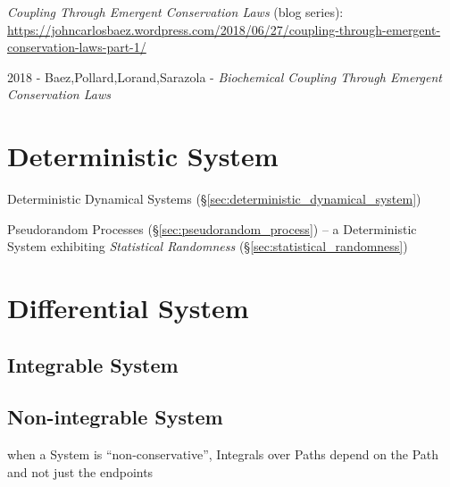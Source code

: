 \emph{Coupling Through Emergent Conservation Laws} (blog series):
\url{https://johncarlosbaez.wordpress.com/2018/06/27/coupling-through-emergent-conservation-laws-part-1/}

2018 - Baez,Pollard,Lorand,Sarazola -
\emph{Biochemical Coupling Through Emergent Conservation Laws}



\section{Deterministic System}\label{sec:deterministic_system}

\fist Deterministic Dynamical Systems
(\S\ref{sec:deterministic_dynamical_system})

\fist Pseudorandom Processes (\S\ref{sec:pseudorandom_process}) -- a
Deterministic System exhibiting \emph{Statistical Randomness}
(\S\ref{sec:statistical_randomness})



\section{Differential System}\label{sec:differential_system}




\subsection{Integrable System}\label{sec:integrable_system}

\subsection{Non-integrable System}\label{sec:nonintegrable_system}

when a System is ``non-conservative'', Integrals over Paths depend on the Path
and not just the endpoints

